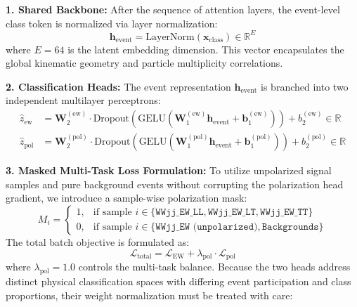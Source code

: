 \documentclass[12pt]{article}
\begin{document}
			\noindent\textbf{1. Shared Backbone:} After the sequence of attention layers, the event-level class token is normalized via layer normalization:
			\begin{equation*}
				\mathbf{h}_{\mathrm{event}} = \mathrm{LayerNorm}(\mathbf{x}_{\mathrm{class}}) \in \mathbb{R}^{E}
			\end{equation*}
			where $E = 64$ is the latent embedding dimension. This vector encapsulates the global kinematic geometry and particle multiplicity correlations.

			\noindent\textbf{2. Classification Heads:} The event representation $\mathbf{h}_{\mathrm{event}}$ is branched into two independent multilayer perceptrons:
			\begin{align*}
				\hat{z}_{\mathrm{ew}} &= \mathbf{W}_2^{(\mathrm{ew})} \cdot \mathrm{Dropout}(\mathrm{GELU}(\mathbf{W}_1^{(\mathrm{ew})} \mathbf{h}_{\mathrm{event}} + \mathbf{b}_1^{(\mathrm{ew})})) + b_2^{(\mathrm{ew})} \in \mathbb{R} \\
				\hat{z}_{\mathrm{pol}} &= \mathbf{W}_2^{(\mathrm{pol})} \cdot \mathrm{Dropout}(\mathrm{GELU}(\mathbf{W}_1^{(\mathrm{pol})} \mathbf{h}_{\mathrm{event}} + \mathbf{b}_1^{(\mathrm{pol})})) + b_2^{(\mathrm{pol})} \in \mathbb{R}
			\end{align*}

			\noindent\textbf{3. Masked Multi-Task Loss Formulation:} To utilize unpolarized signal samples and pure background events without corrupting the polarization head gradient, we introduce a sample-wise polarization mask:
			\begin{equation*}
				M_i = \begin{cases}
					1, & \text{if sample } i \in \{\texttt{WWjj\_EW\_LL}, \texttt{WWjj\_EW\_LT}, \texttt{WWjj\_EW\_TT}\} \\
					0, & \text{if sample } i \in \{\texttt{WWjj\_EW (unpolarized)}, \texttt{Backgrounds}\}
				\end{cases}
			\end{equation*}
			The total batch objective is formulated as:
			\begin{equation*}
				\mathcal{L}_{\mathrm{total}} = \mathcal{L}_{\mathrm{EW}} + \lambda_{\mathrm{pol}} \cdot \mathcal{L}_{\mathrm{pol}}
			\end{equation*}
			where $\lambda_{\mathrm{pol}} = 1.0$ controls the multi-task balance. Because the two heads address distinct physical classification spaces with differing event participation and class proportions, their weight normalization must be treated with care:
\end{document}
